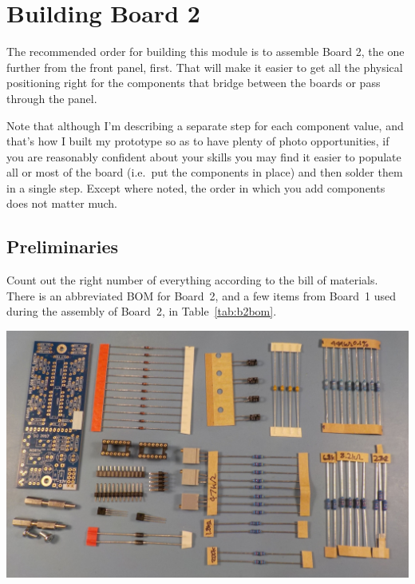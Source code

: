 
%
%
%
%
%
%

\chapter{Building Board 2}

The recommended order for building this module is to assemble Board 2, the
one further from the front panel, first.  That will make it easier to get
all the physical positioning right for the components that bridge between
the boards or pass through the panel.

Note that although I'm describing a separate step for each component value,
and that's how I built my prototype so as to have plenty of photo
opportunities, if you are reasonably confident about your skills you may
find it easier to populate all or most of the board (i.e.\ put the
components in place) and then solder them in a single step.  Except where
noted, the order in which you add components does not matter much.

\section{Preliminaries}

Count out the right number of everything according to the bill of materials. 
There is an abbreviated BOM for Board~2, and a few items from Board~1 used
during the assembly of Board~2, in Table~\ref{tab:b2bom}.

\noindent\includegraphics[width=\linewidth]{board2-parts.jpg}


